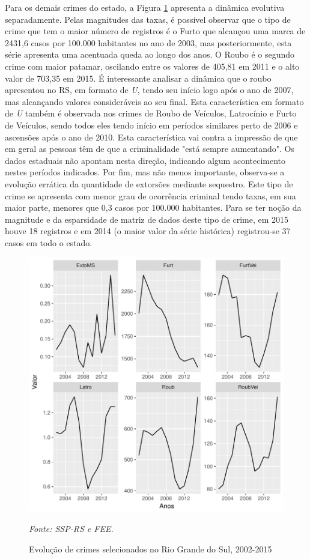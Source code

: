 \documentclass[12pt,openright,oneside,a4paper,english,french,spanish]{abntex2}
\numberwithin{table}{section} %
\numberwithin{figure}{section} %
\newcommand{\source}[1]{\textit{#1}}
\begin{document}
Para os demais crimes do estado, a Figura \ref{fig:outroscrimesRS} apresenta a dinâmica evolutiva separadamente. Pelas magnitudes das taxas, é possível observar que o tipo de crime que tem o maior número de registros é o Furto que alcançou uma marca de 2431,6 casos por 100.000 habitantes no ano de 2003, mas posteriormente, esta série apresenta uma acentuada queda ao longo dos anos. O Roubo é o segundo crime com maior patamar, oscilando entre os valores de 405,81 em 2011 e o alto valor de 703,35 em 2015. É interessante analisar a dinâmica que o roubo apresentou no RS, em formato de \textit{U}, tendo seu início logo após o ano de 2007, mas alcançando valores consideráveis ao seu final. Esta característica em formato de \textit{U} também é observada nos crimes de Roubo de Veículos, Latrocínio e Furto de Veículos, sendo todos eles tendo início em períodos similares perto de 2006 e ascensões após o ano de 2010. Esta característica vai contra a impressão de que em geral as pessoas têm de que a criminalidade "está sempre aumentando". Os dados estaduais não apontam nesta direção, indicando algum acontecimento nestes períodos indicados. Por fim, mas não menos importante, observa-se a evolução errática da quantidade de extorsões mediante sequestro. Este tipo de crime se apresenta com menor grau de ocorrência criminal tendo taxas, em sua maior parte, menores que 0,3 casos por 100.000 habitantes. Para se ter noção da magnitude e da esparsidade de matriz de dados deste tipo de crime, em 2015 houve 18 registros e em 2014 (o maior valor da série histórica) registrou-se 37 casos em todo o estado. 

\begin{figure}
\begin{center}
\includegraphics{TESE_DE_DOUTORADO_RENAN_FINAL-plot4}
\end{center}
\caption{Evolução de crimes selecionados no Rio Grande do Sul, 2002-2015}
\source{Fonte: SSP-RS e FEE.}
\label{fig:outroscrimesRS}
\end{figure}
\end{document}
